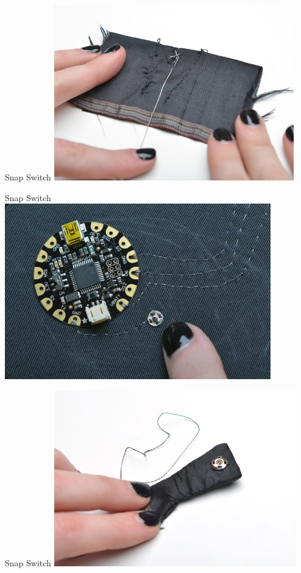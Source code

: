 \documentclass{beamer}
\begin{document}
\begin{frame}[fragile]{Snap Switch}
\includegraphics[height=3in]{flora-angler-embroidery-20.jpg}
\end{frame}
\begin{frame}[fragile]{Snap Switch}
\includegraphics[height=3in]{flora-angler-embroidery-21a.jpg}
\end{frame}
\begin{frame}[fragile]{Snap Switch}
\includegraphics[height=3in]{flora-angler-embroidery-21.jpg}
\end{frame}
\end{document}
